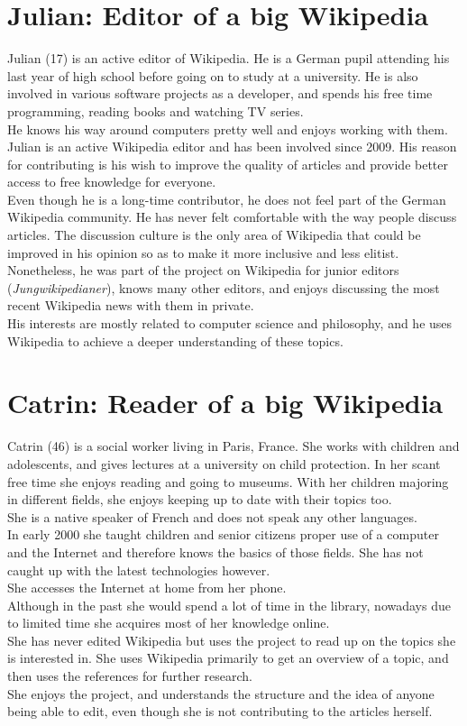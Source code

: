 \section{Julian: Editor of a big Wikipedia}
Julian (17) is an active editor of Wikipedia. He is a German pupil attending his last year of high school before going on to study at a university. He is also involved in various software projects as a developer, and spends his free time programming, reading books and watching TV series. \\
He knows his way around computers pretty well and enjoys working with them. \\
Julian is an active Wikipedia editor and has been involved since 2009. His reason for contributing is his wish to improve the quality of articles and provide better access to free knowledge for everyone. \\
Even though he is a long-time contributor, he does not feel part of the German Wikipedia community. He has never felt comfortable with the way people discuss articles. The discussion culture is the only area of Wikipedia that could be improved in his opinion so as to make it more inclusive and less elitist. \\
Nonetheless, he was part of the project on Wikipedia for junior editors (\textit{Jungwikipedianer}), knows many other editors, and enjoys discussing the most recent Wikipedia news with them in private. \\
His interests are mostly related to computer science and philosophy, and he uses Wikipedia to achieve a deeper understanding of these topics.

\section{Catrin: Reader of a big Wikipedia}
Catrin (46) is a social worker living in Paris, France. She works with children and adolescents, and gives lectures at a university on child protection. In her scant free time she enjoys reading and going to museums. With her children majoring in different fields, she enjoys keeping up to date with their topics too. \\
She is a native speaker of French and does not speak any other languages. \\
In early 2000 she taught children and senior citizens proper use of a computer and the Internet and therefore knows the basics of those fields. She has not caught up with the latest technologies however. \\
She accesses the Internet at home from her phone. \\
Although in the past she would spend a lot of time in the library, nowadays due to limited time she acquires most of her knowledge online. \\
She has never edited Wikipedia but uses the project to read up on the topics she is interested in. She uses Wikipedia primarily to get an overview of a topic, and then uses the references for further research. \\
She enjoys the project, and understands the structure and the idea of anyone being able to edit, even though she is not contributing to the articles herself. \\


